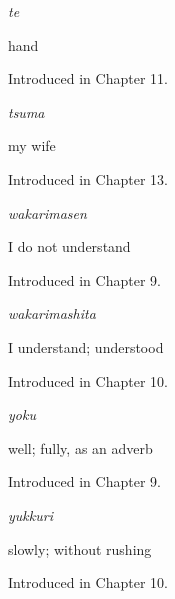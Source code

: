 \noindent\begin{minipage}[t]{\linewidth}
\raggedright
\textbf{}\enspace\emph{te}\par
\small hand\par
\footnotesize Introduced in Chapter 11.
\end{minipage}\par\medskip

\noindent\begin{minipage}[t]{\linewidth}
\raggedright
\textbf{}\enspace\emph{tsuma}\par
\small my wife\par
\footnotesize Introduced in Chapter 13.
\end{minipage}\par\medskip

\noindent\begin{minipage}[t]{\linewidth}
\raggedright
\textbf{}\enspace\emph{wakarimasen}\par
\small I do not understand\par
\footnotesize Introduced in Chapter 9.
\end{minipage}\par\medskip

\noindent\begin{minipage}[t]{\linewidth}
\raggedright
\textbf{}\enspace\emph{wakarimashita}\par
\small I understand; understood\par
\footnotesize Introduced in Chapter 10.
\end{minipage}\par\medskip

\noindent\begin{minipage}[t]{\linewidth}
\raggedright
\textbf{}\enspace\emph{yoku}\par
\small well; fully, as an adverb\par
\footnotesize Introduced in Chapter 9.
\end{minipage}\par\medskip

\noindent\begin{minipage}[t]{\linewidth}
\raggedright
\textbf{}\enspace\emph{yukkuri}\par
\small slowly; without rushing\par
\footnotesize Introduced in Chapter 10.
\end{minipage}\par\medskip
